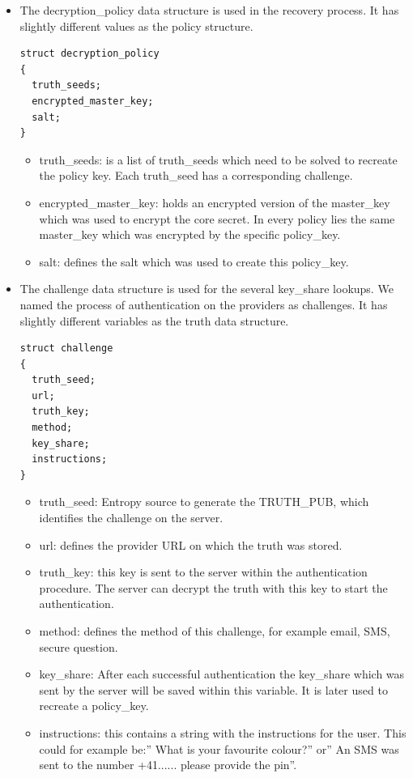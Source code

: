 \begin{itemize}
\item
The decryption\_policy data structure is used in the recovery process. It has slightly different values as the policy structure.
\begin{lstlisting}
struct decryption_policy
{
  truth_seeds;
  encrypted_master_key;
  salt;
}
\end{lstlisting}
\begin{itemize}
\item truth\_seeds: is a list of truth\_seeds which need to be solved to recreate the policy key. Each truth\_seed has a corresponding challenge.
\item encrypted\_master\_key: holds an encrypted version of the master\_key which was used to encrypt the core secret. In every policy lies the same master\_key which was encrypted by the specific policy\_key.
\item salt: defines the salt which was used to create this policy\_key.
\end{itemize}
\newpage
\item
The challenge data structure is used for the several key\_share lookups.
We named the process of authentication on the providers as challenges.
It has slightly different variables as the truth data structure.
\begin{lstlisting}
struct challenge
{
  truth_seed;
  url;
  truth_key;
  method;
  key_share;
  instructions;
}
\end{lstlisting}
\begin{itemize}
\item truth\_seed: Entropy source to generate the TRUTH\_PUB, which identifies the challenge on the server.
\item url: defines the provider URL on which the truth was stored.
\item truth\_key: this key is sent to the server within the authentication procedure. The server can decrypt the truth with this key to start the authentication.
\item method: defines the method of this challenge, for example email, SMS, secure question.
\item key\_share: After each successful authentication the key\_share which was sent by the server will be saved within this variable. It is later used to recreate a policy\_key.
\item instructions: this contains a string with the instructions for the user. This could for example be:” What is your favourite colour?” or” An SMS was sent to the number +41...... please provide the pin”.
\end{itemize}
\end{itemize}

